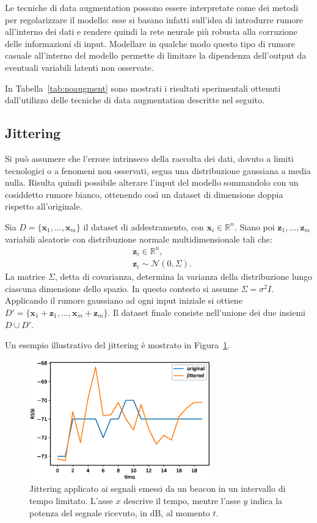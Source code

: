 Le tecniche di data augmentation possono essere interpretate come dei metodi
per regolarizzare il modello: esse si basano infatti sull'idea di introdurre rumore
all'interno dei dati e rendere quindi la rete neurale più robusta alla
corruzione delle informazioni di input. Modellare in qualche modo questo tipo
di rumore casuale all'interno del modello permette di limitare la dipendenza
dell'output da eventuali variabili latenti non osservate.

In Tabella~\ref{tab:noaugment} sono mostrati i risultati sperimentali ottenuti
dall'utilizzo delle tecniche di data augmentation descritte nel seguito.


\subsection{Jittering}
Si può assumere che l'errore intrinseco della raccolta dei dati, dovuto a
limiti tecnologici o a fenomeni non osservati, segua una distribuzione
gaussiana a media nulla. Risulta quindi possibile alterare l'input del
modello sommandolo con un cosiddetto rumore bianco, ottenendo così un dataset
di dimensione doppia rispetto all'originale. 

Sia \(D = \{\bm x_1, \dotsc, \bm x_m\}\) il dataset di addestramento, con 
\(\bm x_i \in \mathbb{R}^n \). Siano poi \(\bm z_1,
  \dotsc, \bm z_m \) variabili aleatorie con distribuzione normale
multidimensionale tali che: 
\begin{align*}
& \bm z_i \in \mathbb{R}^n, \\ 
& \bm z_i \sim \mathcal{N}(0, \Sigma).
\end{align*}
La matrice \(\Sigma\), detta di covarianza, determina la varianza della
distribuzione lungo ciascuna dimensione dello spazio. In questo contesto si
assume \(\Sigma=\sigma^2I\). Applicando il rumore gaussiano ad ogni input
iniziale si ottiene \(D' = \{\bm x_1 + \bm z_1, \dotsc, \bm x_m + \bm z_m\}\).
Il dataset finale consiste nell'unione dei due insiemi \( D \cup D'\).

Un esempio illustrativo del jittering è mostrato in Figura~\ref{fig:jitter}.
\begin{figure}[!htp]
  \centering\includegraphics[width=0.7\textwidth]{./img/jittering.eps}
  \caption{Jittering applicato ai segnali emessi da un beacon in un intervallo
    di tempo limitato. L'asse \(x\) descrive il tempo, mentre l'asse \(y\)
    indica la potenza del segnale ricevuto, in dB, al momento \(t\).}%
  \label{fig:jitter}%
\end{figure}

